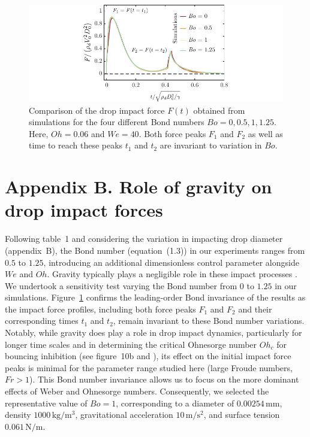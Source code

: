 \documentclass[]{article}
\newcommand{\oo}{\color{magenta} \normalfont}
\newcommand{\bb}{\color{black} \normalfont}
\begin{document}
\begin{enumerate}
\begin{itemize}
		\begin{figure}
			\centering
			\includegraphics[width=\textwidth]{../main/Figures/figureA1.pdf}
			\caption{{\oo Comparison of the drop impact force $F(t)$ obtained from simulations for the four different Bond numbers $Bo = 0, 0.5, 1, 1.25$. Here, $Oh = 0.06$ and $We = 40$. Both force peaks $F_1$ and $F_2$ as well as time to reach these peaks $t_1$ and $t_2$ are invariant to variation in $Bo$. \bb}}
			\label{fig:AppGravity}
		\end{figure}
		
		\oo 
		
		\section*{Appendix B. Role of gravity on drop impact forces}
		\label{app:gravity}
		
		Following table~1 and considering the variation in impacting drop diameter (appendix~B), the Bond number (equation~(1.3)) in our experiments ranges from $0.5$ to $1.25$, introducing an additional dimensionless control parameter alongside $We$ and $Oh$. 
		Gravity typically plays a negligible role in these impact processes \citep{sanjay_chantelot_lohse_2023,sanjay2024PRL}. We undertook a sensitivity test varying the Bond number from $0$ to $1.25$ in our simulations. 
		Figure~\ref{fig:AppGravity} confirms the leading-order Bond invariance of the results as the impact force profiles, including both force peaks $F_1$ and $F_2$ and their corresponding times $t_1$ and $t_2$, remain invariant to these Bond number variations.
		Notably, while gravity does play a role in drop impact dynamics, particularly for longer time scales and in determining the critical Ohnesorge number $Oh_c$ for bouncing inhibition (see figure~10b and \citet{sanjay_chantelot_lohse_2023}), its effect on the initial impact force peaks is minimal for the parameter range studied here (large Froude numbers, $Fr > 1$). This Bond number invariance allows us to focus on the more dominant effects of Weber and Ohnesorge numbers.
		Consequently, we selected the representative value of $Bo = 1$, corresponding to a diameter of $0.00254\,\si{\milli\meter}$, density $1000\,\si{\kilogram/\meter^3}$, gravitational acceleration $10\,\si{\meter/\second^2}$, and surface tension $0.061\,\si{\newton/\meter}$. 
		\bb
		

\end{itemize}
\end{enumerate}
\end{document}
